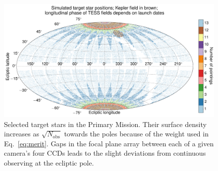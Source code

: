 \begin{figure}[!tb] %
	\centering
	\includegraphics{figures/positions_pointings_kepler.pdf}
	\caption{Selected target stars in the Primary Mission. Their surface 
	density increases as $\sqrt{N_\text{obs}}$ towards the poles because of the 
	weight used	in Eq.~\protect\ref{eq:merit}. Gaps in the focal plane array 
	between each of a 
	given camera's four CCDs leads to the slight deviations from 
	continuous observing at the ecliptic pole.}
	\label{fig:positions_pointings}
\end{figure}
